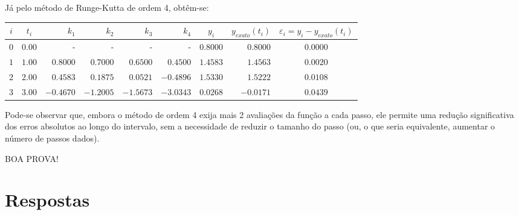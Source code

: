 \documentclass[12pt,a4paper]{article}
\begin{document}
\begin{ExerciseList}
\begin{enumerate}
Já pelo método de Runge-Kutta de ordem 4, obtêm-se:
\begin{center}
\begin{tabular}{|c|c|r|r|r|r|c|r|c|}
\hline
  $i$
& $t_i$
& $k_1$
& $k_2$
& $k_3$
& $k_4$
& $y_i$
& $y_{exato}(t_i)$
& $\varepsilon_i = y_i-y_{exato}(t_i)$ \\ \hline\hline
$0$ & $0.00$ &   -     &   -     &   -     &   -     & $ 0.8000$ & $ 0.8000$ & $0.0000$ \\ \hline
$1$ & $1.00$ & $ 0.8000$ & $ 0.7000$ & $ 0.6500$ & $ 0.4500$ & $ 1.4583$ & $ 1.4563$ & $0.0020$ \\ \hline
$2$ & $2.00$ & $ 0.4583$ & $ 0.1875$ & $ 0.0521$ & $-0.4896$ & $ 1.5330$ & $ 1.5222$ & $0.0108$ \\ \hline
$3$ & $3.00$ & $-0.4670$ & $-1.2005$ & $-1.5673$ & $-3.0343$ & $ 0.0268$ & $-0.0171$ & $0.0439$ \\ \hline
\end{tabular}
\end{center}
Pode-se observar que, embora o método de ordem 4 exija mais 2 avaliações da função a cada passo, ele permite uma redução significativa dos erros absolutos ao longo do intervalo, sem a necessidade de reduzir o tamanho do passo (ou, o que seria equivalente, aumentar o número de passos dados).

\end{enumerate}
\end{ExerciseList}

\vspace{0.4cm}
\begin{center}
BOA PROVA!
\end{center}

\newpage
\restoregeometry
\section*{Respostas}
\shipoutAnswer
\end{document}
